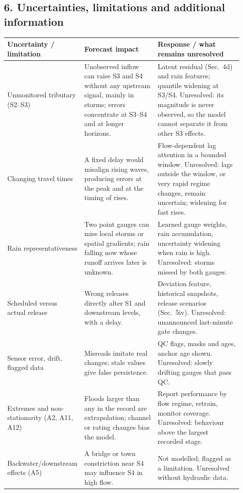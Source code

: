 \subsection*{6. Uncertainties, limitations and additional information}
\small
\begin{longtable}{@{}p{0.17\linewidth}p{0.36\linewidth}p{0.43\linewidth}@{}}
\toprule
\textbf{Uncertainty / limitation} & \textbf{Forecast impact} & \textbf{Response / what remains unresolved}\\ \midrule\endhead
Unmonitored tributary (S2--S3) & Unobserved inflow can raise S3 and S4 without any upstream signal, mainly in storms; errors concentrate at S3--S4 and at longer horizons. & Latent residual (Sec.~4d) and rain features; quantile widening at S3/S4. Unresolved: its magnitude is never observed, so the model cannot separate it from other S3 effects.\\
Changing travel times & A fixed delay would misalign rising waves, producing errors at the peak and at the timing of rises. & Flow-dependent lag attention in a bounded window. Unresolved: lags outside the window, or very rapid regime changes, remain uncertain; widening for fast rises.\\
Rain representativeness & Two point gauges can miss local storms or spatial gradients; rain falling now whose runoff arrives later is unknown. & Learned gauge weights, rain accumulation, uncertainty widening when rain is high. Unresolved: storms missed by both gauges.\\
Scheduled versus actual release & Wrong releases directly alter S1 and downstream levels, with a delay. & Deviation feature, historical snapshots, release scenarios (Sec.~5iv). Unresolved: unannounced last-minute gate changes.\\
Sensor error, drift, flagged data & Misreads imitate real changes; stale values give false persistence. & QC flags, masks and ages, anchor age shown. Unresolved: slowly drifting gauges that pass QC.\\
Extremes and non-stationarity (A2, A11, A12) & Floods larger than any in the record are extrapolation; channel or rating changes bias the model. & Report performance by flow regime, retrain, monitor coverage. Unresolved: behaviour above the largest recorded stage.\\
Backwater/downstream effects (A5) & A bridge or town constriction near S4 may influence S4 in high flow. & Not modelled; flagged as a limitation. Unresolved without hydraulic data.\\
\bottomrule
\end{longtable}

